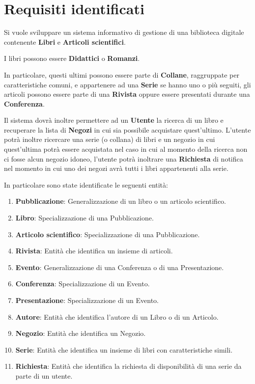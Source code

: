 \chapter{Requisiti identificati}\label{Capitolo1}
Si vuole sviluppare un sistema informativo di gestione di una biblioteca digitale contenente \textbf{Libri} e
\textbf{Articoli scientifici}.

I libri possono essere \textbf{Didattici} o \textbf{Romanzi}.

In particolare, questi ultimi possono essere parte di \textbf{Collane}, raggruppate per caratteristiche
comuni, e appartenere ad una \textbf{Serie} se hanno uno o pi\`u seguiti, gli articoli possono essere parte
di una \textbf{Rivista} oppure essere presentati durante una \textbf{Conferenza}.

Il sistema dovr\`a inoltre permettere ad un \textbf{Utente} la ricerca di un libro
e recuperare la lista di \textbf{Negozi} in cui sia possibile acquistare quest'ultimo.
L'utente potr\`a inoltre ricercare una serie (o collana) di libri e un negozio in cui
quest'ultima potr\`a essere acquistata nel caso in cui al momento della ricerca non ci fosse alcun negozio idoneo,
l'utente potr\`a inoltrare una \textbf{Richiesta} di notifica nel momento in cui uno dei negozi avr\`a tutti i libri 
appartenenti alla serie.

In particolare sono state identificate le seguenti entit\`a:
\begin{enumerate}
    \item \textbf{Pubblicazione}: Generalizzazione di un libro o un articolo scientifico.
    \item \textbf{Libro}: Specializzazione di una Pubblicazione.
    \item \textbf{Articolo scientifico}: Specializzazione di una Pubblicazione.
    \item \textbf{Rivista}: Entit\`a che identifica un insieme di articoli.
    \item \textbf{Evento}: Generalizzazione di una Conferenza o di una Presentazione.
    \item \textbf{Conferenza}: Specializzazione di un Evento.
    \item \textbf{Presentazione}: Specializzazione di un Evento.
    \item \textbf{Autore}: Entit\`a che identifica l'autore di un Libro o di un Articolo.
    \item \textbf{Negozio}: Entit\`a che identifica un Negozio.
    \item \textbf{Serie}: Entit\`a che identifica un insieme di libri con caratteristiche simili.
    \item \textbf{Richiesta}: Entit\`a che identifica la richiesta di disponibilit\`a di una serie da 
    parte di un utente.
\end{enumerate}